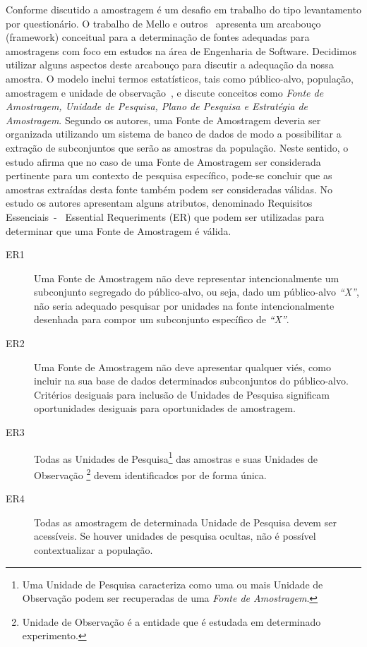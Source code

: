 Conforme discutido a amostragem é um desafio em trabalho do tipo levantamento
por questionário. O trabalho de Mello e outros~\cite{de2014towards} apresenta um
arcabouço (framework) conceitual para a determinação de fontes adequadas para
amostragens com foco em estudos na área de Engenharia de Software. Decidimos
utilizar alguns aspectos deste arcabouço para discutir a adequação da nossa
amostra. O modelo inclui termos estatísticos, tais como público-alvo, população,
amostragem e unidade de observação~\cite{thompson2012sampling}, e discute
conceitos como \textit{Fonte de Amostragem, Unidade de Pesquisa, Plano de
    Pesquisa e Estratégia de Amostragem}. Segundo os autores, uma Fonte de
Amostragem deveria ser organizada utilizando um sistema de banco de dados de
modo a possibilitar a extração de subconjuntos que serão as amostras da
população. Neste sentido, o estudo afirma que no caso de uma Fonte de Amostragem
ser considerada pertinente para um contexto de pesquisa específico, pode-se
concluir que as amostras extraídas desta fonte também podem ser consideradas
válidas. No estudo os autores apresentam alguns atributos, denominado Requisitos
Essenciais~-~ Essential Requeriments (ER) que podem ser utilizadas para
determinar que uma Fonte de Amostragem é válida.

\begin{description}
    \item[ER1] Uma Fonte de Amostragem não deve representar intencionalmente um
        subconjunto segregado do público-alvo, ou seja, dado um público-alvo
        \textit{``X''}, não seria adequado pesquisar por unidades na fonte
        intencionalmente desenhada para compor um subconjunto específico de
        \textit{``X''}.
    \item[ER2] Uma Fonte de Amostragem não deve apresentar qualquer viés, como
        incluir na sua base de dados determinados subconjuntos do público-alvo.
        Critérios desiguais para inclusão de Unidades de Pesquisa significam
        oportunidades desiguais para oportunidades de amostragem.
    \item[ER3] Todas as Unidades de Pesquisa\footnote{Uma Unidade de Pesquisa
            caracteriza como uma ou mais Unidade de Observação podem ser
            recuperadas de uma \textit{Fonte de Amostragem}.  } das amostras e
        suas Unidades de Observação \footnote{Unidade de Observação é a entidade
            que é estudada em determinado experimento.}
devem identificados por de forma única.
	\item[ER4] Todas as amostragem de determinada Unidade de Pesquisa devem ser
		acessíveis. Se houver unidades de pesquisa ocultas, não é possível
		contextualizar a população.
\end{description}

